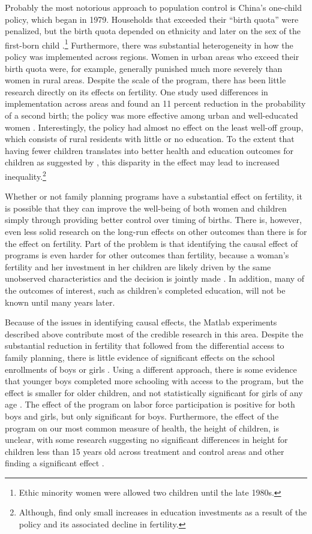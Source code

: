 \documentclass[]{article}
\begin{document}
Probably the most notorious approach to population control is China's one-child policy, which began in 1979. Households that exceeded their ``birth quota'' were penalized, but the birth quota depended on ethnicity and later on the sex of the first-born child \citep{Li2005}.\footnote{Ethic minority women were allowed two children until the late 1980s.} Furthermore, there was substantial heterogeneity in how the policy was implemented across regions. Women in urban areas who exceed their birth quota were, for example, generally punished much more severely than women in rural areas. Despite the scale of the program, there has been little research directly on its effects on fertility. One study used differences in implementation across areas and found an 11 percent reduction in the probability of a second birth; the policy was more effective among urban and well-educated women \citep{Li2005}. Interestingly, the policy had almost no eﬀect on the least well-oﬀ group, which consists of rural residents with little or no education. To the extent that having fewer children translates into better health and education outcomes for children as suggested by \citet{becker73}, this disparity in the effect may lead to increased inequality.\footnote{Although, \citet{Rosenzweig2009} find only small increases in education investments as a result of the policy and its associated decline in fertility.}

Whether or not family planning programs have a substantial effect on fertility, it is possible that they can improve the well-being of both women and children simply through providing better control over timing of births. There is, however, even less solid research on the long-run effects on other outcomes than there is for the effect on fertility. Part of the problem is that identifying the causal effect of programs is even harder for other outcomes than fertility, because a woman's fertility and her investment in her children are likely driven by the same unobserved characteristics and the decision is jointly made \citep{Schultz2005}. In addition, many of the outcomes of interest, such as children's completed education, will not be known until many years later.

Because of the issues in identifying causal effects, the Matlab experiments described above contribute most of the credible research in this area. Despite the substantial reduction in fertility that followed from the differential access to family planning, there is little evidence of significant effects on the school enrollments of boys or girls \citep{Sinha2005}. Using a different approach, there is some evidence that younger boys completed more schooling with access to the program, but the effect is smaller for older children, and not statistically significant for girls of any age \citep{Joshi2007}. The effect of the program on labor force participation is positive for both boys and girls, but only signiﬁcant for boys. Furthermore, the effect of the program on our most common measure of health, the height of children, is unclear, with some research suggesting no significant differences in height for children less than 15 years old across treatment and control areas \citep{Joshi2007} and other finding a significant effect \citep{Barham2012}.
\end{document}
